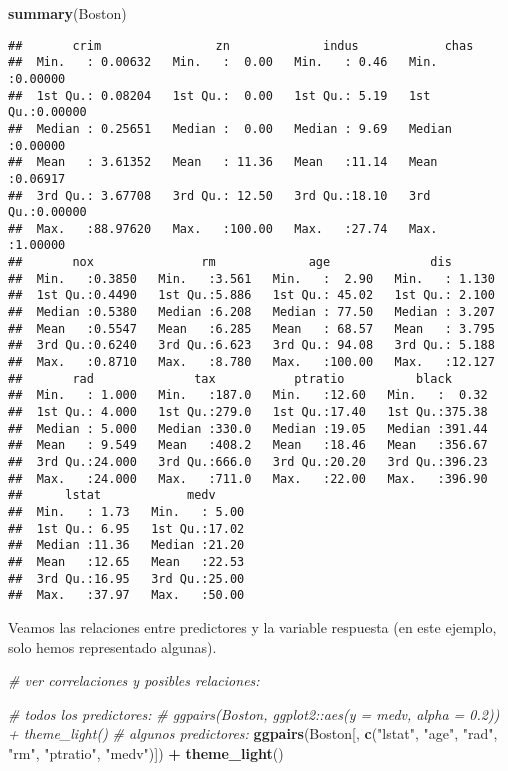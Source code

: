 \documentclass[]{book}
\newenvironment{Shaded}{\begin{snugshade}}{\end{snugshade}}
\newcommand{\CommentTok}[1]{\textcolor[rgb]{0.56,0.35,0.01}{\textit{#1}}}
\newcommand{\KeywordTok}[1]{\textcolor[rgb]{0.13,0.29,0.53}{\textbf{#1}}}
\newcommand{\NormalTok}[1]{#1}
\newcommand{\OperatorTok}[1]{\textcolor[rgb]{0.81,0.36,0.00}{\textbf{#1}}}
\newcommand{\StringTok}[1]{\textcolor[rgb]{0.31,0.60,0.02}{#1}}
\begin{document}
\begin{Shaded}
\begin{Highlighting}[]
\KeywordTok{summary}\NormalTok{(Boston)}
\end{Highlighting}
\end{Shaded}

\begin{verbatim}
##       crim                zn             indus            chas        
##  Min.   : 0.00632   Min.   :  0.00   Min.   : 0.46   Min.   :0.00000  
##  1st Qu.: 0.08204   1st Qu.:  0.00   1st Qu.: 5.19   1st Qu.:0.00000  
##  Median : 0.25651   Median :  0.00   Median : 9.69   Median :0.00000  
##  Mean   : 3.61352   Mean   : 11.36   Mean   :11.14   Mean   :0.06917  
##  3rd Qu.: 3.67708   3rd Qu.: 12.50   3rd Qu.:18.10   3rd Qu.:0.00000  
##  Max.   :88.97620   Max.   :100.00   Max.   :27.74   Max.   :1.00000  
##       nox               rm             age              dis        
##  Min.   :0.3850   Min.   :3.561   Min.   :  2.90   Min.   : 1.130  
##  1st Qu.:0.4490   1st Qu.:5.886   1st Qu.: 45.02   1st Qu.: 2.100  
##  Median :0.5380   Median :6.208   Median : 77.50   Median : 3.207  
##  Mean   :0.5547   Mean   :6.285   Mean   : 68.57   Mean   : 3.795  
##  3rd Qu.:0.6240   3rd Qu.:6.623   3rd Qu.: 94.08   3rd Qu.: 5.188  
##  Max.   :0.8710   Max.   :8.780   Max.   :100.00   Max.   :12.127  
##       rad              tax           ptratio          black       
##  Min.   : 1.000   Min.   :187.0   Min.   :12.60   Min.   :  0.32  
##  1st Qu.: 4.000   1st Qu.:279.0   1st Qu.:17.40   1st Qu.:375.38  
##  Median : 5.000   Median :330.0   Median :19.05   Median :391.44  
##  Mean   : 9.549   Mean   :408.2   Mean   :18.46   Mean   :356.67  
##  3rd Qu.:24.000   3rd Qu.:666.0   3rd Qu.:20.20   3rd Qu.:396.23  
##  Max.   :24.000   Max.   :711.0   Max.   :22.00   Max.   :396.90  
##      lstat            medv      
##  Min.   : 1.73   Min.   : 5.00  
##  1st Qu.: 6.95   1st Qu.:17.02  
##  Median :11.36   Median :21.20  
##  Mean   :12.65   Mean   :22.53  
##  3rd Qu.:16.95   3rd Qu.:25.00  
##  Max.   :37.97   Max.   :50.00
\end{verbatim}

Veamos las relaciones entre predictores y la variable respuesta (en este ejemplo, solo hemos representado algunas).

\begin{Shaded}
\begin{Highlighting}[]
\CommentTok{# ver correlaciones y posibles relaciones:}

\CommentTok{# todos los predictores:}
\CommentTok{# ggpairs(Boston, ggplot2::aes(y = medv, alpha = 0.2)) + theme_light()}
\CommentTok{# algunos predictores:}
\KeywordTok{ggpairs}\NormalTok{(Boston[, }\KeywordTok{c}\NormalTok{(}\StringTok{"lstat"}\NormalTok{, }\StringTok{"age"}\NormalTok{, }\StringTok{"rad"}\NormalTok{, }\StringTok{"rm"}\NormalTok{, }\StringTok{"ptratio"}\NormalTok{, }\StringTok{"medv"}\NormalTok{)]) }\OperatorTok{+}\StringTok{ }\KeywordTok{theme_light}\NormalTok{()}
\end{Highlighting}
\end{Shaded}
\end{document}
